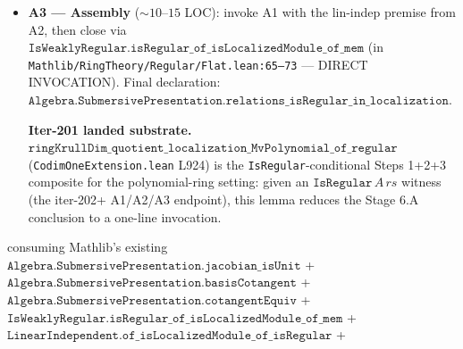 \begin{itemize}
    \textbf{Iter-201 landed substrate.} Two A2 sub-pieces are
    axiom-clean private theorems in
    \texttt{CodimOneExtension.lean}:
    \begin{itemize}
      \item \(\texttt{submersivePresentation\_relation\_cotangent\_mk\_linearIndependent}\)
        (L854): forward-ergonomic re-package of
        \(\texttt{Basis.linearIndependent}\) +
        \(\texttt{basisCotangent\_apply}\), expressing lin-indep
        directly in the \(\texttt{Cotangent.mk}\)-of-relation form.
      \item \(\texttt{submersivePresentation\_relation\_cotangent\_mk\_linearIndependent\_localized}\)
        (L889): transport through the canonical localisation map
        \(\texttt{LocalizedModule.mkLinearMap}\) at any prime
        \(p\) of \(S\), via
        \(\texttt{LinearIndependent.of\_isLocalizedModule}\).
    \end{itemize}
    \textbf{Iter-202+ A2 residual.} The conormal-localisation iso
    for \(\texttt{IsLocalization.AtPrime}\) (Stacks 02JK at a
    non-Away prime; the Mathlib infrastructure
    \(\texttt{Algebra.Generators.cotangentCompLocalizationAwayEquiv}\)
    generalises only to the Away case) is the remaining substantive
    gap on the A2 side. Estimated \(\sim 50\)--\(100\) LOC.
  \item \textbf{A3 — Assembly} (\(\sim 10\)--\(15\) LOC): invoke
    A1 with the lin-indep premise from A2, then close via
    \(\texttt{IsWeaklyRegular.isRegular\_of\_isLocalizedModule\_of\_mem}\)
    (in \texttt{Mathlib/RingTheory/Regular/Flat.lean:65--73} ---
    DIRECT INVOCATION). Final declaration:
    \(\texttt{Algebra.SubmersivePresentation.relations\_isRegular\_in\_localization}\).

    \textbf{Iter-201 landed substrate.}
    \(\texttt{ringKrullDim\_quotient\_localization\_MvPolynomial\_of\_regular}\)
    (\texttt{CodimOneExtension.lean} L924) is the
    \texttt{IsRegular}-conditional Steps 1+2+3 composite for the
    polynomial-ring setting: given an \(\texttt{IsRegular}\,A\,rs\)
    witness (the iter-202+ A1/A2/A3 endpoint), this lemma reduces
    the Stage 6.A conclusion to a one-line invocation.
\end{itemize}
consuming Mathlib's existing
\(\texttt{Algebra.SubmersivePresentation.jacobian\_isUnit}\) +
\(\texttt{Algebra.SubmersivePresentation.basisCotangent}\) +
\(\texttt{Algebra.SubmersivePresentation.cotangentEquiv}\) +
\(\texttt{IsWeaklyRegular.isRegular\_of\_isLocalizedModule\_of\_mem}\) +
\(\texttt{LinearIndependent.of\_isLocalizedModule\_of\_isRegular}\) +
